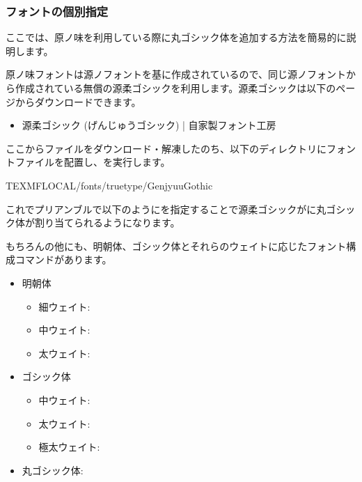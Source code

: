 \documentclass[../otf-unofficial-guide]{subfiles}
\begin{document}
\subsubsection{フォントの個別指定}

ここでは、原ノ味を利用している際に丸ゴシック体を追加する方法を簡易的に説明します。

原ノ味フォントは源ノフォントを基に作成されているので、同じ源ノフォントから作成されている無償の源柔ゴシックを利用します。源柔ゴシックは以下のページからダウンロードできます。

\begin{itemize}
  \item 源柔ゴシック (げんじゅうゴシック) | 自家製フォント工房
\end{itemize}

ここからファイルをダウンロード・解凍したのち、以下のディレクトリにフォントファイルを配置し、を実行します。

\begin{directory}
\textdollar TEXMFLOCAL/fonts/truetype/GenjyuuGothic
\end{directory}

これでプリアンブルで以下のようにを指定することで源柔ゴシックがに丸ゴシック体が割り当てられるようになります。

\begin{texsource}
\usepackage[noalphabet, haranoaji]{pxchfon}
\end{texsource}

もちろんの他にも、明朝体、ゴシック体とそれらのウェイトに応じたフォント構成コマンドがあります。

\begin{itemize}
  \item 明朝体
  \begin{itemize}
    \item 細ウェイト:  
    \item 中ウェイト:  
    \item 太ウェイト:  
  \end{itemize}
  \item ゴシック体
  \begin{itemize}
    \item 中ウェイト:    
    \item 太ウェイト:    
    \item 極太ウェイト:  
  \end{itemize}
  \item 丸ゴシック体:    
\end{itemize}
\end{document}
